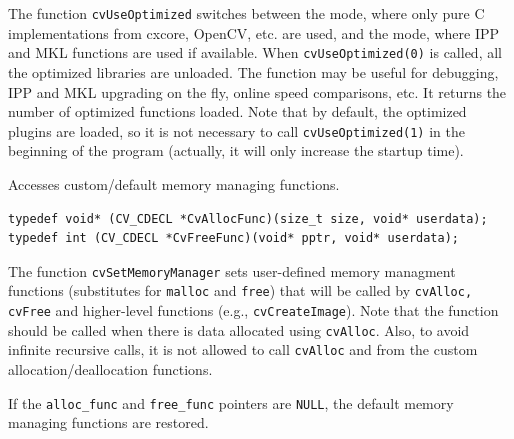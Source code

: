The function \texttt{cvUseOptimized} switches between the mode, where
only pure C implementations from cxcore, OpenCV, etc. are used, and
the mode, where IPP and MKL functions are used if available. When
\texttt{cvUseOptimized(0)} is called, all the optimized libraries are
unloaded. The function may be useful for debugging, IPP and MKL upgrading on
the fly, online speed comparisons, etc. It returns the number of optimized
functions loaded. Note that by default, the optimized plugins are loaded,
so it is not necessary to call \texttt{cvUseOptimized(1)} in the beginning of
the program (actually, it will only increase the startup time).

\label{SetMemoryManager}

Accesses custom/default memory managing functions.

\begin{lstlisting}
typedef void* (CV_CDECL *CvAllocFunc)(size_t size, void* userdata);
typedef int (CV_CDECL *CvFreeFunc)(void* pptr, void* userdata);
\end{lstlisting}


\begin{description}
\end{description}

The function \texttt{cvSetMemoryManager} sets user-defined memory
managment functions (substitutes for \texttt{malloc} and \texttt{free}) that will be called
by \texttt{cvAlloc, cvFree} and higher-level functions (e.g., \texttt{cvCreateImage}). Note
that the function should be called when there is data allocated using
\texttt{cvAlloc}. Also, to avoid infinite recursive calls, it is not
allowed to call \texttt{cvAlloc} and  from the custom
allocation/deallocation functions.

If the \texttt{alloc\_func} and \texttt{free\_func} pointers are
\texttt{NULL}, the default memory managing functions are restored.

